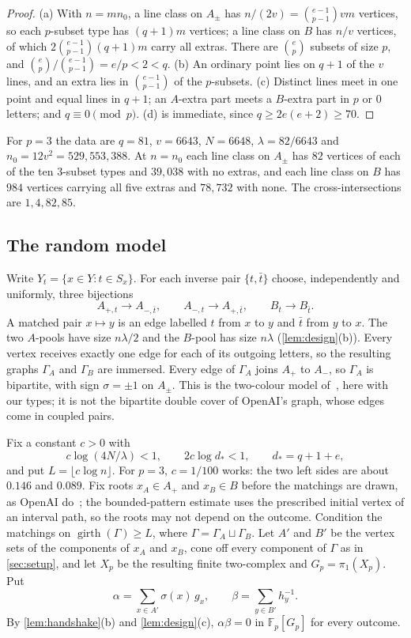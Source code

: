 \documentclass[11pt]{article}
\theoremstyle{definition}
\theoremstyle{plain}
\newcommand{\F}{\mathbb{F}}
\newcommand{\girth}{\operatorname{girth}}
\begin{document}
\begin{proof}
(a) With $n=mn_0$, a line class on $A_\pm$ has $n/(2v)=\binom{e-1}{p-1}vm$ vertices, so each $p$-subset type has $(q+1)m$ vertices; a line class on $B$ has $n/v$ vertices, of which $2\binom{e-1}{p-1}(q+1)m$ carry all extras. There are $\binom ep$ subsets of size $p$, and $\binom ep/\binom{e-1}{p-1}=e/p<2<q$. (b) An ordinary point lies on $q+1$ of the $v$ lines, and an extra lies in $\binom{e-1}{p-1}$ of the $p$-subsets. (c) Distinct lines meet in one point and equal lines in $q+1$; an $A$-extra part meets a $B$-extra part in $p$ or $0$ letters; and $q\equiv0\pmod p$. (d) is immediate, since $q\ge2e(e+2)\ge70$.
\end{proof}

For $p=3$ the data are $q=81$, $v=6643$, $N=6648$, $\lambda=82/6643$ and $n_0=12v^2=529{,}553{,}388$. At $n=n_0$ each line class on $A_\pm$ has $82$ vertices of each of the ten $3$-subset types and $39{,}038$ with no extras, and each line class on $B$ has $984$ vertices carrying all five extras and $78{,}732$ with none. The cross-intersections are $1,4,82,85$.

\subsection{The random model}\label{sec:zdmodel}

Write $Y_t=\{x\in Y:t\in S_x\}$. For each inverse pair $\{t,\bar t\}$ choose, independently and uniformly, three bijections
\[
A_{+,t}\to A_{-,\bar t},\qquad A_{-,t}\to A_{+,\bar t},\qquad B_t\to B_{\bar t}.
\]
A matched pair $x\mapsto y$ is an edge labelled $t$ from $x$ to $y$ and $\bar t$ from $y$ to $x$. The two $A$-pools have size $n\lambda/2$ and the $B$-pool has size $n\lambda$ (\cref{lem:design}(b)). Every vertex receives exactly one edge for each of its outgoing letters, so the resulting graphs $\Gamma_A$ and $\Gamma_B$ are immersed. Every edge of $\Gamma_A$ joins $A_+$ to $A_-$, so $\Gamma_A$ is bipartite, with sign $\sigma=\pm1$ on $A_\pm$. This is the two-colour model of~\cite[Construction~4.1]{Ivanov2026}, here with our types; it is not the bipartite double cover of OpenAI's graph, whose edges come in coupled pairs.

Fix a constant $c>0$ with
\begin{equation}\label{eq:c}
c\log(4N/\lambda)<1,\qquad 2c\log d_*<1,\qquad d_*=q+1+e,
\end{equation}
and put $L=\lfloor c\log n\rfloor$. For $p=3$, $c=1/100$ works: the two left sides are about $0.146$ and $0.089$. Fix roots $x_A\in A_+$ and $x_B\in B$ before the matchings are drawn, as OpenAI do~\cite[\S2.1]{OAI196}; the bounded-pattern estimate uses the prescribed initial vertex of an interval path, so the roots may not depend on the outcome. Condition the matchings on $\girth(\Gamma)\ge L$, where $\Gamma=\Gamma_A\sqcup\Gamma_B$. Let $A'$ and $B'$ be the vertex sets of the components of $x_A$ and $x_B$, cone off every component of $\Gamma$ as in \cref{sec:setup}, and let $X_p$ be the resulting finite two-complex and $G_p=\pi_1(X_p)$. Put
\[
\alpha=\sum_{x\in A'}\sigma(x)\,g_x,\qquad \beta=\sum_{y\in B'}h_y^{-1}.
\]
By \cref{lem:handshake}(b) and \cref{lem:design}(c), $\alpha\beta=0$ in $\F_p[G_p]$ for every outcome.
\end{document}
